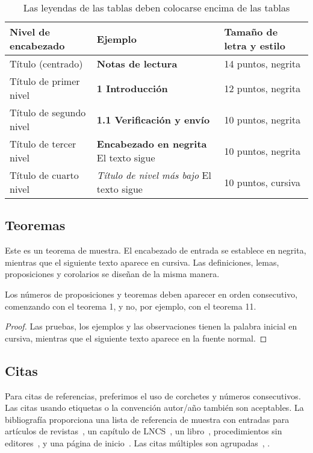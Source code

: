 \documentclass[runningheads,a4paper]{llncs}
\begin{document}
\begin{table}
\caption{Las leyendas de las tablas deben colocarse encima de las tablas}\label{tab1}
\begin{tabular}{lll}
\toprule
Nivel de encabezado & Ejemplo & Tamaño de letra y estilo\\
\midrule
Título (centrado) &  {\Large\bfseries Notas de lectura} & 14 puntos, negrita\\
Título de primer nivel &  {\large\bfseries 1 Introducción} & 12 puntos, negrita\\
Título de segundo nivel & {\bfseries 1.1 Verificación y envío} & 10 puntos, negrita\\
Título de tercer nivel & {\bfseries Encabezado en negrita} El texto sigue & 10 puntos, negrita\\
Título de cuarto nivel & {\itshape Título de nivel más bajo} El texto sigue & 10 puntos, cursiva\\
\bottomrule
\end{tabular}
\end{table}

\subsection{Teoremas}
\begin{theorem}
Este es un teorema de muestra. El encabezado de entrada se establece en negrita, mientras que el siguiente texto aparece en cursiva. Las definiciones, lemas, proposiciones y corolarios se diseñan de la misma manera.
\end{theorem}

Los números de proposiciones y teoremas deben aparecer en orden consecutivo, comenzando con el teorema 1, y no, por ejemplo, con el teorema 11.

\begin{proof}
Las pruebas, los ejemplos y las observaciones tienen la palabra inicial en cursiva, mientras que el siguiente texto aparece en la fuente normal.
\end{proof}

\subsection{Citas}
Para citas de referencias, preferimos el uso de corchetes y números consecutivos. Las citas usando etiquetas o la convención autor/año también son aceptables. La bibliografía proporciona una lista de referencia de muestra con entradas para artículos de revistas~\cite{ref_article1}, un capítulo de LNCS~\cite{ref_lncs1}, un libro~\cite{ref_book1}, procedimientos sin editores~\cite{ref_proc1}, y una página de inicio~\cite{ref_url1}. Las citas múltiples son agrupadas~\cite{ref_article1,ref_lncs1,ref_book1}, \cite{ref_article1,ref_book1,ref_proc1,ref_url1}.
\end{document}
